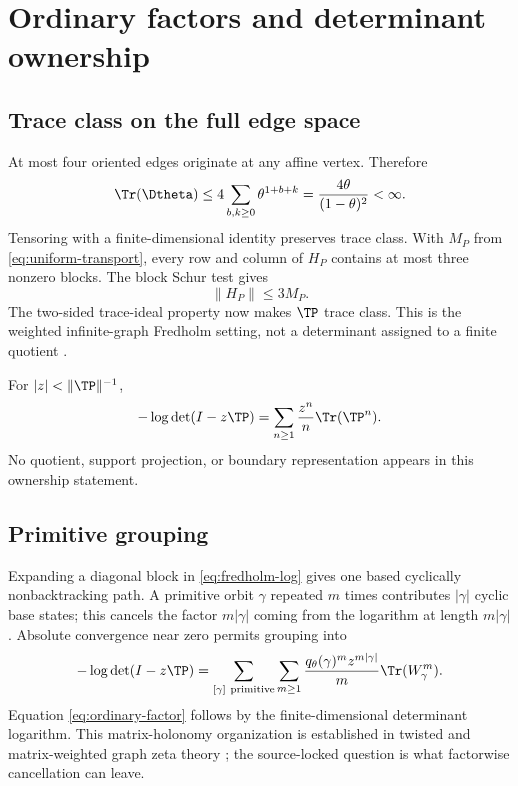 \section{Ordinary factors and determinant ownership}
\label{sec:factor}

\subsection{Trace class on the full edge space}

At most four oriented edges originate at any affine vertex.  Therefore
\begin{equation}
  \Tr(\Dtheta)
  \le 4\sum_{b,k\ge0}\theta^{1+b+k}
  =\frac{4\theta}{(1-\theta)^2}<\infty.
  \label{eq:damping-trace}
\end{equation}
Tensoring with a finite-dimensional identity preserves trace class.  With
$M_P$ from \cref{eq:uniform-transport}, every row and column of $H_P$
contains at most three nonzero blocks.  The block Schur test gives
\begin{equation}
  \lVert H_P\rVert\le3M_P.
  \label{eq:block-schur}
\end{equation}
The two-sided trace-ideal property now makes $\TP$ trace class.  This is the
weighted infinite-graph Fredholm setting, not a determinant assigned to a
finite quotient \citep{Deitmar2015}.

For $|z|<\lVert\TP\rVert^{-1}$,
\begin{equation}
  -\log\det(I-z\TP)
  =\sum_{n\ge1}\frac{z^n}{n}\Tr(\TP^n).
  \label{eq:fredholm-log}
\end{equation}
No quotient, support projection, or boundary representation appears in this
ownership statement.

\subsection{Primitive grouping}

Expanding a diagonal block in \cref{eq:fredholm-log} gives one based
cyclically nonbacktracking path.  A primitive orbit $\gamma$ repeated $m$
times contributes $|\gamma|$ cyclic base states; this cancels the factor
$m|\gamma|$ coming from the logarithm at length $m|\gamma|$.  Absolute
convergence near zero permits grouping into
\begin{equation}
  -\log\det(I-z\TP)
  =\sum_{[\gamma]\ \mathrm{primitive}}\sum_{m\ge1}
  \frac{q_\theta(\gamma)^m z^{m|\gamma|}}{m}
  \Tr(W_\gamma^m).
  \label{eq:primitive-expansion}
\end{equation}
Equation \eqref{eq:ordinary-factor} follows by the finite-dimensional
determinant logarithm.  This matrix-holonomy organization is established in
twisted and matrix-weighted graph zeta theory
\citep{AdachiSunada1987,Goda2020,MatsuuraOhta2024}; the source-locked question
is what factorwise cancellation can leave.

